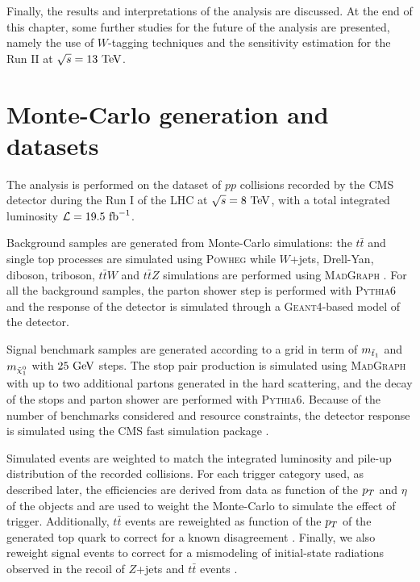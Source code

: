     Finally, the results and interpretations of the analysis are discussed. At
    the end of this chapter, some further studies for the future of the analysis
    are presented, namely the use of $W$-tagging techniques and the sensitivity
    estimation for the Run II at $\sqrt{s} = 13~\text{TeV}$.

    \section{Monte-Carlo generation and datasets}

    The analysis is performed on the dataset of $pp$ collisions recorded by the
    CMS detector during the Run I of the LHC at $\sqrt{s} = 8~\text{TeV}$, with a total
    integrated luminosity $\mathcal{L} = 19.5~\text{fb}^{-1}$.

    Background samples are generated from Monte-Carlo simulations: the
    $t\bar{t}$ and single top processes are simulated using \textsc{Powheg}
    \cite{Powheg} while $W$+jets, Drell-Yan, diboson, triboson, $t\bar{t}W$ and
    $t\bar{t}Z$ simulations are performed using \textsc{MadGraph}
    \cite{Madgraph}. For all the background samples, the parton shower step is
    performed with \textsc{Pythia}6 \cite{Pythia} and the response of the
    detector is simulated through a \textsc{Geant4}-based model of the detector.

    Signal benchmark samples are generated according to a grid in term of
    $m_{\tilde{t}_1}$ and $m_{\tilde{\chi}_1^0}$ with $25~\text{GeV}$ steps. The stop pair
    production is simulated using \textsc{MadGraph} with up to two additional
    partons generated in the hard scattering, and the decay of the stops and
    parton shower are performed with \textsc{Pythia6}. Because of the number of
    benchmarks considered and resource constraints, the detector response is
    simulated using the CMS fast simulation package \cite{Fastsim}.

    Simulated events are weighted to match the integrated luminosity and pile-up
    distribution of the recorded collisions. For each trigger category used, as
    described later, the efficiencies are derived from data as function of the
    $p_T$ and $\eta$ of the objects and are used to weight the Monte-Carlo to
    simulate the effect of trigger. Additionally, $t\bar{t}$ events are
    reweighted as function of the $p_T$ of the generated top quark to correct
    for a known disagreement \cite{topPtReweighting}. Finally, we also reweight
    signal events to correct for a mismodeling of initial-state radiations
    observed in the recoil of $Z$+jets and $t\bar{t}$ events
    \cite{ISRmodelingDominick}.

